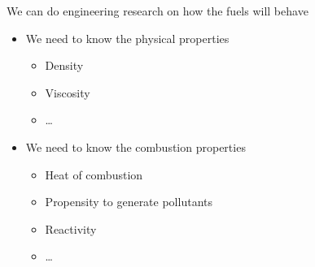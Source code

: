 \documentclass{beamer}
\begin{document}
\begin{frame}{We can do engineering research on how the fuels will behave}
    \begin{itemize}
        \item We need to know the physical properties
        \begin{itemize}
            \item Density
            \item Viscosity
            \item \ldots
        \end{itemize}
        \item We need to know the \alert<2->{combustion properties}
        \begin{itemize}
            \item Heat of combustion
            \item Propensity to generate pollutants
            \item Reactivity
            \item \ldots
        \end{itemize}
    \end{itemize}
\end{frame}
\end{document}
